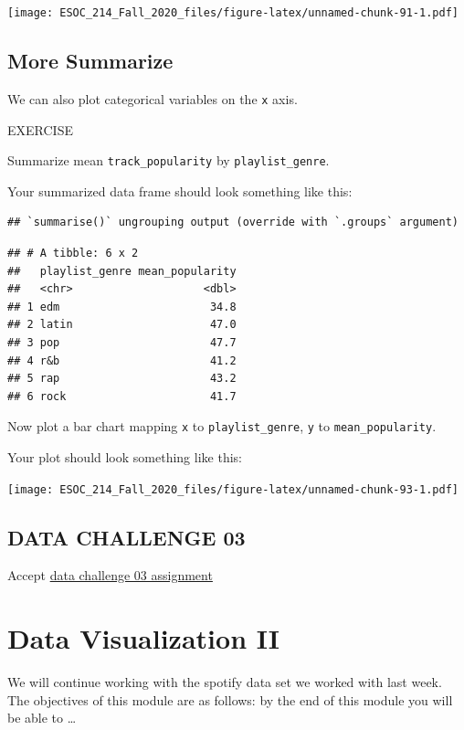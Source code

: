\documentclass[
]{book}
\begin{document}
\texttt{[image: ESOC\_214\_Fall\_2020\_files/figure-latex/unnamed-chunk-91-1.pdf]}

\hypertarget{more-summarize}{%
\section{More Summarize}\label{more-summarize}}

We can also plot categorical variables on the \texttt{x} axis.

EXERCISE

Summarize mean \texttt{track\_popularity} by \texttt{playlist\_genre}.

Your summarized data frame should look something like this:

\begin{verbatim}
## `summarise()` ungrouping output (override with `.groups` argument)
\end{verbatim}

\begin{verbatim}
## # A tibble: 6 x 2
##   playlist_genre mean_popularity
##   <chr>                    <dbl>
## 1 edm                       34.8
## 2 latin                     47.0
## 3 pop                       47.7
## 4 r&b                       41.2
## 5 rap                       43.2
## 6 rock                      41.7
\end{verbatim}

Now plot a bar chart mapping \texttt{x} to \texttt{playlist\_genre}, \texttt{y} to \texttt{mean\_popularity}.

Your plot should look something like this:

\texttt{[image: ESOC\_214\_Fall\_2020\_files/figure-latex/unnamed-chunk-93-1.pdf]}

\hypertarget{data-challenge-03}{%
\section{DATA CHALLENGE 03}\label{data-challenge-03}}

Accept \href{https://classroom.github.com/a/ndGrSqaq}{data challenge 03 assignment}

\hypertarget{data-visualization-ii}{%
\chapter{Data Visualization II}\label{data-visualization-ii}}

We will continue working with the spotify data set we worked with last week. The objectives of this module are as follows: by the end of this module you will be able to \ldots{}
\end{document}
